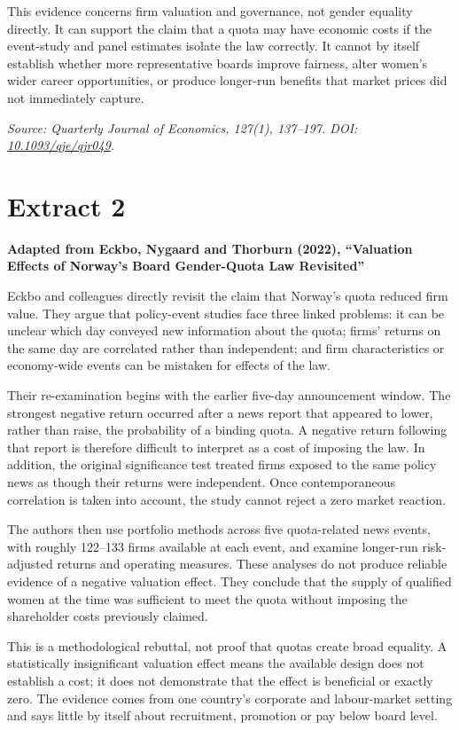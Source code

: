 \documentclass[11pt,a4paper]{article}
\newcommand{\sourceheading}[2]{%
  \section*{#1}
  \textbf{#2}\par\medskip
}
\begin{document}
This evidence concerns firm valuation and governance, not gender equality directly. It can support the claim that a quota may have economic costs if the event-study and panel estimates isolate the law correctly. It cannot by itself establish whether more representative boards improve fairness, alter women's wider career opportunities, or produce longer-run benefits that market prices did not immediately capture.

\textit{Source: Quarterly Journal of Economics, 127(1), 137--197. DOI: \href{https://doi.org/10.1093/qje/qjr049}{10.1093/qje/qjr049}.}

\newpage

\sourceheading{Extract 2}{Adapted from Eckbo, Nygaard and Thorburn (2022), ``Valuation Effects of Norway's Board Gender-Quota Law Revisited''}

Eckbo and colleagues directly revisit the claim that Norway's quota reduced firm value. They argue that policy-event studies face three linked problems: it can be unclear which day conveyed new information about the quota; firms' returns on the same day are correlated rather than independent; and firm characteristics or economy-wide events can be mistaken for effects of the law.

Their re-examination begins with the earlier five-day announcement window. The strongest negative return occurred after a news report that appeared to lower, rather than raise, the probability of a binding quota. A negative return following that report is therefore difficult to interpret as a cost of imposing the law. In addition, the original significance test treated firms exposed to the same policy news as though their returns were independent. Once contemporaneous correlation is taken into account, the study cannot reject a zero market reaction.

The authors then use portfolio methods across five quota-related news events, with roughly 122--133 firms available at each event, and examine longer-run risk-adjusted returns and operating measures. These analyses do not produce reliable evidence of a negative valuation effect. They conclude that the supply of qualified women at the time was sufficient to meet the quota without imposing the shareholder costs previously claimed.

This is a methodological rebuttal, not proof that quotas create broad equality. A statistically insignificant valuation effect means the available design does not establish a cost; it does not demonstrate that the effect is beneficial or exactly zero. The evidence comes from one country's corporate and labour-market setting and says little by itself about recruitment, promotion or pay below board level.
\end{document}
